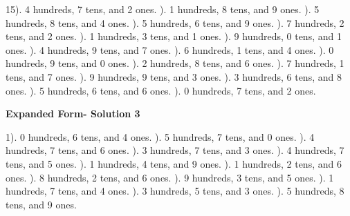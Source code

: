 \documentclass{article}%
\begin{document}
15). 4 hundreds, 7 tens, and 2 ones.%
). 1 hundreds, 8 tens, and 9 ones.%
). 5 hundreds, 8 tens, and 4 ones.%
). 5 hundreds, 6 tens, and 9 ones.%
). 7 hundreds, 2 tens, and 2 ones.%
). 1 hundreds, 3 tens, and 1 ones.%
). 9 hundreds, 0 tens, and 1 ones.%
). 4 hundreds, 9 tens, and 7 ones.%
). 6 hundreds, 1 tens, and 4 ones.%
). 0 hundreds, 9 tens, and 0 ones.%
). 2 hundreds, 8 tens, and 6 ones.%
). 7 hundreds, 1 tens, and 7 ones.%
). 9 hundreds, 9 tens, and 3 ones.%
). 3 hundreds, 6 tens, and 8 ones.%
). 5 hundreds, 6 tens, and 6 ones.%
). 0 hundreds, 7 tens, and 2 ones.%
\newline%
\newpage%
\large%
\begin{center}%
\textbf{Expanded Form- Solution 3}%
\newline%
\end{center} \normalsize%
1). 0 hundreds, 6 tens, and 4 ones.%
). 5 hundreds, 7 tens, and 0 ones.%
). 4 hundreds, 7 tens, and 6 ones.%
). 3 hundreds, 7 tens, and 3 ones.%
). 4 hundreds, 7 tens, and 5 ones.%
). 1 hundreds, 4 tens, and 9 ones.%
). 1 hundreds, 2 tens, and 6 ones.%
). 8 hundreds, 2 tens, and 6 ones.%
). 9 hundreds, 3 tens, and 5 ones.%
). 1 hundreds, 7 tens, and 4 ones.%
). 3 hundreds, 5 tens, and 3 ones.%
). 5 hundreds, 8 tens, and 9 ones.%
\end{document}
